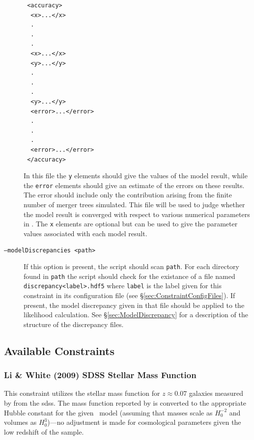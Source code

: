 \begin{description}
\begin{verbatim}
 <accuracy>
  <x>...</x>
  .
  .
  .
  <x>...</x>
  <y>...</y>
  .
  .
  .
  <y>...</y>
  <error>...</error>
  .
  .
  .
  <error>...</error>
 </accuracy>
\end{verbatim}
In this file the {\tt y} elements should give the values of the model result, while the {\tt error} elements should give an estimate of the errors on these results. The error should include only the contribution arising from the finite number of merger trees simulated. This file will be used to judge whether the model result is converged with respect to various numerical parameters in \glc. The {\tt x} elements are optional but can be used to give the parameter values associated with each model result.
 \item [{\tt --modelDiscrepancies <path>}] If this option is present, the script should scan {\tt path}. For each directory found in {\tt path} the script should check for the existance of a file named {\tt discrepancy<label>.hdf5} where {\tt label} is the label given for this constraint in its configuration file (see \S\ref{sec:ConstraintConfigFiles}). If present, the model discrepancy given in that file should be applied to the likelihood calculation. See \S\ref{sec:ModelDiscrepancy} for a description of the structure of the discrepancy files.
\end{description}

\subsection{Available Constraints}

\subsubsection{Li \& White (2009) SDSS Stellar Mass Function}

This constraint utilizes the stellar mass function for $z\approx 0.07$ galaxies measured by \cite{li_distribution_2009} from the \gls{sdss}. The mass function reported by \cite{li_distribution_2009} is converted to the appropriate Hubble constant for the given \glc\ model (assuming that masses scale as $H_0^{-2}$ and volumes as $H_0^3$)---no adjustment is made for cosmological parameters given the low redshift of the sample.

